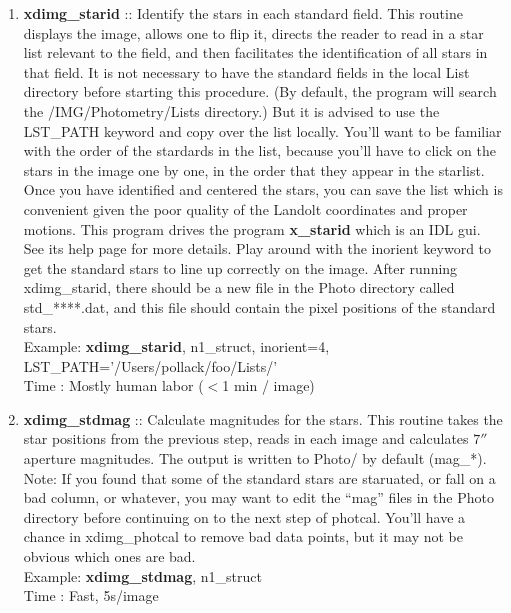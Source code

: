 \documentclass[11pt,letterpaper,dvips]{article}
\begin{document}
\begin{enumerate}
\begin{enumerate}
	  \item {\bf xdimg\_starid} :: Identify the stars in each
            standard field.  This routine displays the image, allows
            one to flip it, directs the reader to read in a star list
            relevant to the field, and then facilitates the
            identification of all stars in that field.  It is not
            necessary to have the standard fields in the local List
            directory before starting this procedure.  (By default,
            the program will search the /IMG/Photometry/Lists
            directory.)  But it is advised to use the LST\_PATH
            keyword and copy over the list locally.  You'll want to be
            familiar with the order of the stardards in the list,
            because you'll have to click on the stars in the image one
            by one, in the order that they appear in the starlist.
            Once you have identified and centered the stars, you can
            save the list which is convenient given the poor quality
            of the Landolt coordinates and proper motions.  This
            program drives the program {\bf x\_starid} which is an IDL
            gui.  See its help page for more details.  Play around with the inorient keyword to get the standard stars to line up correctly on the image.  After running xdimg\_starid, there should be a new file in the Photo directory called std\_****.dat, and this file should contain the pixel positions of the standard stars.\\
            \quad Example: {\bf xdimg\_starid}, n1\_struct, inorient=4, LST\_PATH='/Users/pollack/foo/Lists/' \\
            \quad Time : Mostly human labor ($<$1 min / image)

	  \item {\bf xdimg\_stdmag} :: Calculate magnitudes for the stars.  This 
		routine takes the star positions from the previous step, 
		reads in each image and calculates $7''$ aperture magnitudes.
		The output is written to Photo/ by default (mag\_*).  Note: If you found that some of the standard stars are staruated, or fall on a bad column, or whatever, you may want to edit the ``mag'' files in the Photo directory before continuing on to the next step of photcal.  You'll have a chance in xdimg\_photcal to remove bad data points, but it may not be obvious which ones are bad. \\
         	\quad Example: {\bf xdimg\_stdmag}, n1\_struct \\
	        \quad Time   : Fast, 5s/image


\end{enumerate}
\end{enumerate}
\end{document}
